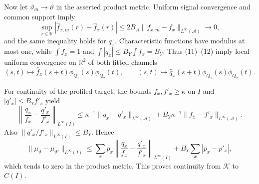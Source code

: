 Now let \(\vartheta_m\to\vartheta\) in the asserted product metric.  Uniform
signal convergence and common support imply
\[
 \sup_{r\in\mathbb R}|\widehat f_{x,m}(r)-\widehat f_x(r)|
 \le2B_A\|f_{x,m}-f_x\|_{L^\infty(\mathcal A)}\longrightarrow0,  \tag{12}
\]
and the same inequality holds for \(q_x\).  Characteristic functions have
modulus at most one, while \(\int f_x=1\) and
\(\int|q_x|\le B_Y\int f_x=B_Y\).  Thus (11)--(12) imply local uniform
convergence on \(\mathbb R^2\) of both fitted channels
\[
 (s,t)\longmapsto\widehat f_x(s+t)\phi_{Q_1}(s)\phi_{Q_2}(t),
 \qquad
 (s,t)\longmapsto\widehat q_x(s+t)\phi_{Q_1}(s)\phi_{Q_2}(t).    \tag{13}
\]

For continuity of the profiled target, the bounds
\(f_x,f'_x\ge\kappa\) on \(I\) and \(|q'_x|\le B_Yf'_x\) yield
\[
 \left\|\frac{q_x}{f_x}-\frac{q'_x}{f'_x}\right\|_{L^\infty(I)}
 \le\kappa^{-1}\|q_x-q'_x\|_{L^\infty(\mathcal A)}
    +B_Y\kappa^{-1}\|f_x-f'_x\|_{L^\infty(\mathcal A)}.        \tag{14}
\]
Also \(\|q'_x/f'_x\|_{L^\infty(I)}\le B_Y\).  Hence
\[
 \|\mu_\vartheta-\mu_{\vartheta'}\|_{L^\infty(I)}
 \le\sum_xp_x
       \left\|\frac{q_x}{f_x}-\frac{q'_x}{f'_x}\right\|_{L^\infty(I)}
      +B_Y\sum_x|p_x-p'_x|,                                      \tag{15}
\]
which tends to zero in the product metric.  This proves continuity from
\(\mathscr K\) to \(C(I)\).

